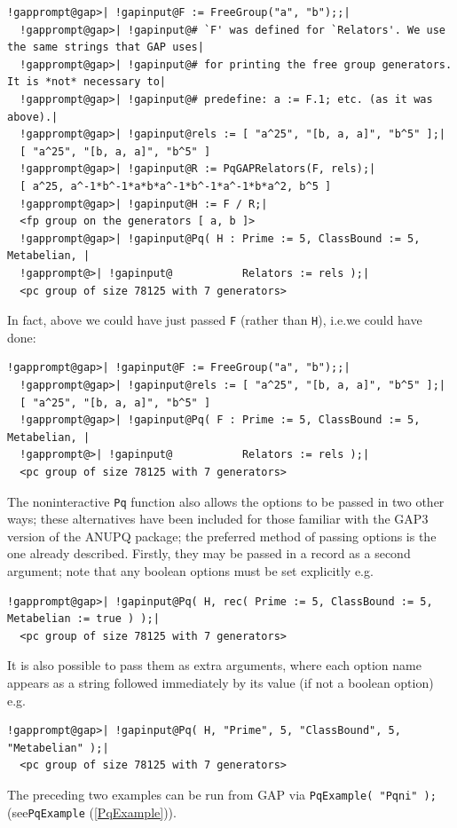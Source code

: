 \documentclass[a4paper,11pt]{report}
\begin{document}
{{{\begin{Verbatim}[commandchars=!@|,fontsize=\small,frame=single,label=Example]
  !gapprompt@gap>| !gapinput@F := FreeGroup("a", "b");;|
  !gapprompt@gap>| !gapinput@# `F' was defined for `Relators'. We use the same strings that GAP uses|
  !gapprompt@gap>| !gapinput@# for printing the free group generators. It is *not* necessary to|
  !gapprompt@gap>| !gapinput@# predefine: a := F.1; etc. (as it was above).|
  !gapprompt@gap>| !gapinput@rels := [ "a^25", "[b, a, a]", "b^5" ];|
  [ "a^25", "[b, a, a]", "b^5" ]
  !gapprompt@gap>| !gapinput@R := PqGAPRelators(F, rels);|
  [ a^25, a^-1*b^-1*a*b*a^-1*b^-1*a^-1*b*a^2, b^5 ]
  !gapprompt@gap>| !gapinput@H := F / R;|
  <fp group on the generators [ a, b ]>
  !gapprompt@gap>| !gapinput@Pq( H : Prime := 5, ClassBound := 5, Metabelian, |
  !gapprompt@>| !gapinput@           Relators := rels );|
  <pc group of size 78125 with 7 generators>
\end{Verbatim}
 In fact, above we could have just passed \texttt{F} (rather than \texttt{H}), i.e.{\nobreakspace}we could have done: 
\begin{Verbatim}[commandchars=!@|,fontsize=\small,frame=single,label=Example]
  !gapprompt@gap>| !gapinput@F := FreeGroup("a", "b");;|
  !gapprompt@gap>| !gapinput@rels := [ "a^25", "[b, a, a]", "b^5" ];|
  [ "a^25", "[b, a, a]", "b^5" ]
  !gapprompt@gap>| !gapinput@Pq( F : Prime := 5, ClassBound := 5, Metabelian, |
  !gapprompt@>| !gapinput@           Relators := rels );|
  <pc group of size 78125 with 7 generators>
\end{Verbatim}
 The non\texttt{}interactive \texttt{Pq} function also allows the options to be passed in two other ways; these
alternatives have been included for those familiar with the \textsf{GAP}{\nobreakspace}3 version of the \textsf{ANUPQ} package; the preferred method of passing options is the one already described.
Firstly, they may be passed in a record as a second argument; note that any
boolean options must be set explicitly e.g. 
\begin{Verbatim}[commandchars=!@|,fontsize=\small,frame=single,label=Example]
  !gapprompt@gap>| !gapinput@Pq( H, rec( Prime := 5, ClassBound := 5, Metabelian := true ) );|
  <pc group of size 78125 with 7 generators>
\end{Verbatim}
 It is also possible to pass them as extra arguments, where each option name
appears as a string followed immediately by its value (if not a boolean
option) e.g. 
\begin{Verbatim}[commandchars=!@|,fontsize=\small,frame=single,label=Example]
  !gapprompt@gap>| !gapinput@Pq( H, "Prime", 5, "ClassBound", 5, "Metabelian" );|
  <pc group of size 78125 with 7 generators>
\end{Verbatim}
 The preceding two examples can be run from \textsf{GAP} via \texttt{PqExample( "Pq\texttt{}ni" );} (see{\nobreakspace}\texttt{PqExample} (\ref{PqExample})). 

}}}
\end{document}
